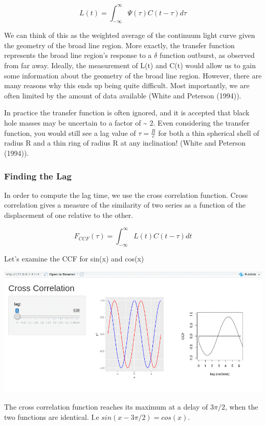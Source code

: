 \documentclass[]{article}
\begin{document}
\[L(t)=\int_{-\infty}^{\infty}\Psi(\tau)C(t-\tau)d\tau\]

We can think of this as the weighted average of the continuum light
curve given the geometry of the broad line region. More exactly, the
transfer function represents the broad line region's response to a
\(\delta\) function outburst, as observed from far away. Ideally, the
measurement of L(t) and C(t) would allow us to gain some information
about the geometry of the broad line region. However, there are many
reasons why this ends up being quite difficult. Most importantly, we are
often limited by the amount of data available (White and Peterson
(1994)).

In practice the transfer function is often ignored, and it is accepted
that black hole masses may be uncertain to a factor of \textasciitilde{}
2. Even considering the transfer function, you would still see a lag
value of \(\tau=\frac{R}{c}\) for both a thin spherical shell of radius
R and a thin ring of radius R at any inclination! (White and Peterson
(1994)).

\hypertarget{finding-the-lag}{%
\subsubsection{Finding the Lag}\label{finding-the-lag}}

In order to compute the lag time, we use the cross correlation function.
Cross correlation gives a measure of the similarity of two series as a
function of the displacement of one relative to the other.

\[F_{CCF}(\tau)=\int_{-\infty}^{\infty}L(t)C(t-\tau)dt\]

Let's examine the CCF for sin(x) and cos(x)

\includegraphics{./singif_screenshots/sinplots.gif}

The cross correlation function reaches its maximum at a delay of
\(3\pi/2\), when the two functions are identical. I.e
\(sin(x-3\pi/2)=cos(x)\).
\end{document}
